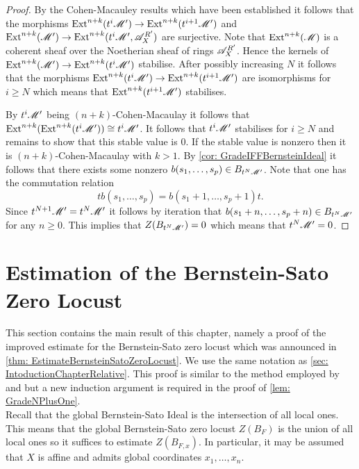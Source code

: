 \begin{proof}
  By the Cohen-Macauley results which have been established it follows that the morphisms $\operatorname{Ext}^{n+k}( t^i\mathscr{M}') \to  \operatorname{Ext}^{n+k}(t^{i+1}\mathscr{M}')$ and $\operatorname{Ext}^{n+k}(\mathscr{M}') \to \operatorname{Ext}^{n+k} (t^i\mathscr{M}',\allowbreak \mathscr{A}_X^{R'})$ are surjective.
  Note that $\operatorname{Ext}^{n+k}(\mathscr{M})$ is a coherent sheaf over the Noetherian sheaf of rings $\mathscr{A}_X^{R'}$.
  Hence the kernels of $\operatorname{Ext}^{n+k}(\mathscr{M}') \to \operatorname{Ext}^{n+k} (t^i\mathscr{M}')$ stabilise.
  After possibly increasing $N$ it follows that the morphisms $\operatorname{Ext}^{n+k}(t^i\mathscr{M}') \to  \operatorname{Ext}^{n+k}(t^{i+1}\mathscr{M}')$ are isomorphisms for $i\geq N$ which means that $\operatorname{Ext}^{n+k}(t^{i+1}\mathscr{M}')$ stabilises.

  By $t^i \mathscr{M}'$ being $(n+k)$-Cohen-Macaulay it follows that $\operatorname{Ext}^{n+k}(\operatorname{Ext}^{n+k}(t^i\mathscr{M}')) \cong t^i\mathscr{M}'$.
  It follows that $t^i \mathscr{M}'$ stabilises for $i\geq N$ and remains to show that this stable value is $0$.
  If the stable value is nonzero then it is $(n+k)$-Cohen-Macaulay with $k>1$.
  By \cref{cor: GradeIFFBernsteinIdeal} it follows that there exists some nonzero $b(s_1,\ldots,s_p) \in B_{t^N\mathscr{M}'}$.
  Note that one has the commutation relation
  $$tb(s_1,\ldots,s_p) = b(s_1+1,\ldots, s_p + 1)t.$$
  Since $t^{N+1}\mathscr{M}' = t^N\mathscr{M}'$ it follows by iteration that $b(s_1+n,\ldots, s_p + n)\in B_{t^N \mathscr{M}'}$ for any $n\geq 0$.
  This implies that $Z(B_{t^N\mathscr{M}'}) = 0$ which means that $t^N\mathscr{M}' = 0$.
\end{proof}
\section{Estimation of the Bernstein-Sato Zero Locust}
This section contains the main result of this chapter, namely a proof of the improved estimate for the Bernstein-Sato zero locust which was announced in \cref{thm: EstimateBernsteinSatoZeroLocust}.
We use the same notation as \cref{sec: IntoductionChapterRelative}.
This proof is similar to the method employed by \cite{lichtin1989poles} and \cite{kashiwara1976b} but a new induction argument is required in the proof of \cref{lem: GradeNPlusOne}.\\

\noindent
Recall that the global Bernstein-Sato Ideal is the intersection of all local ones.
This means that the global Bernstein-Sato zero locust $Z(B_F)$ is the union of all local ones so it suffices to estimate $Z(B_{F,x})$.
In particular, it may be assumed that $X$ is affine and admits global coordinates $x_1,\ldots,x_n$.

